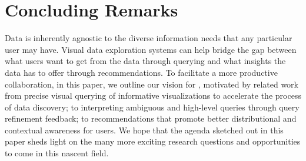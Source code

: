 \section{Concluding Remarks\label{sec:conclusion}}
\par Data is inherently agnostic to the diverse information needs that any particular user may have. 
Visual data exploration systems can 
help bridge the gap between what users want to 
get from the data through querying and 
what insights the data has to offer through recommendations. 
To facilitate a more productive collaboration, 
in this paper, we outline our vision for \vida, motivated by related work 
from precise visual querying of informative visualizations 
to accelerate the process of data discovery; 
to interpreting ambiguous and high-level queries 
through query refinement feedback; to recommendations that promote better distributional 
and contextual awareness for users. 
We hope that the agenda sketched out in this paper 
sheds light on the many more exciting research 
questions and opportunities 
to come in this nascent field.



